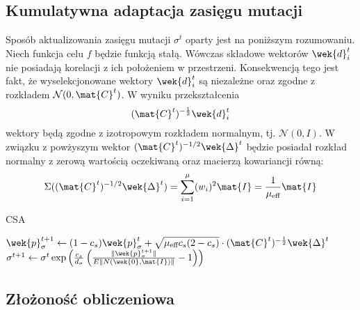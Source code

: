 \subsection{Kumulatywna adaptacja zasięgu mutacji \label{CSA}}
Sposób aktualizowania zasięgu mutacji $\sigma^t$ oparty jest na poniższym rozumowaniu. Niech funkcja celu $f$ będzie funkcją stałą. Wówczas składowe wektorów $\wek{d}_i^t$ nie posiadają korelacji z ich położeniem w przestrzeni.
Konsekwencją tego jest fakt, że wyselekcjonowane wektory  $\wek{d}_i^t$ są niezależne oraz zgodne z rozkładem $\mathcal{N}(0, \mat{C}^{t})$. W wyniku przekształcenia
  \begin{equation}
    (\mat{C}^{t})^{-\frac{1}{2}}\wek{d}_{i}^{t}
  \end{equation}
  wektory będą zgodne z izotropowym rozkładem normalnym, tj. $\mathcal{N}(0, I)$. W związku z powżyszym wektor $(\mat{C}^t)^{-1/2} \wek{\Delta}^t$ będzie posiadał rozkład normalny z zerową wartością oczekiwaną
  oraz macierzą kowariancji równą:
  \begin{equation}
    \Sigma((\mat{C}^t)^{-1/2} \wek{\Delta}^t) = \sum_{i=1}^\mu (w_i)^2 \mat{I}=\frac{1}{\mu_\text{eff}} \mat{I}
    \label{eq:01}
  \end{equation}

\setcounter{algorithm}{0}
\begin{algorithm}[h]
\caption{CSA}
\begin{algorithmic}[1]
   \STATE $\wek{p}_\sigma^{t+1} \gets (1-c_s)\wek{p}_\sigma^t + \sqrt{\mu_\text{eff} c_s(2-c_s)} \cdot (\mat{C}^t)^{-\frac{1}{2}}\wek{\Delta}^t$
   \STATE $\sigma^{t+1} \gets \sigma^t \exp\left(\frac{c_s}{d_\sigma} \left(\frac{\| \wek{p}_\sigma^{t+1} \|}{E\|N(\wek{0},\mat{I})\|}-1\right)\right) $

\end{algorithmic}
\end{algorithm}

\subsection{Złożoność obliczeniowa}

